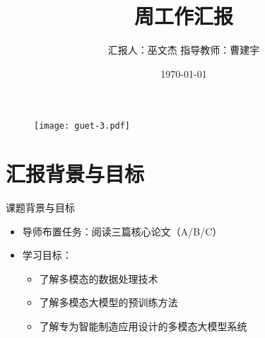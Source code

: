 \documentclass[aspectratio=169,AutoFakeBold]{beamer}
\author{汇报人：巫文杰 \texorpdfstring{\quad}{} 指导教师：曹建宇}
\title{周工作汇报}
\institute{计算机与信息安全学院}
\date{\today}
\begin{document}
\kaishu
\begin{frame}
    \titlepage
    \begin{figure}[htpb]
        \begin{center}
            \texttt{[image: guet-3.pdf]}
        \end{center}
    \end{figure}
\end{frame}

\begin{frame}
    \tableofcontents[sectionstyle=show,subsectionstyle=show/shaded/hide,subsubsectionstyle=show/shaded/hide]
    
\end{frame}

\section{汇报背景与目标}
\begin{frame}{课题背景与目标}
    \begin{itemize}[<+-| alert@+>]
        \item 导师布置任务：阅读三篇核心论文（A/B/C）
        \item 学习目标：
            \begin{itemize}
                \item 了解多模态的数据处理技术
                \item 了解多模态大模型的预训练方法
                \item 了解专为智能制造应用设计的多模态大模型系统
            \end{itemize}
    \end{itemize}
\end{frame}
\end{document}
